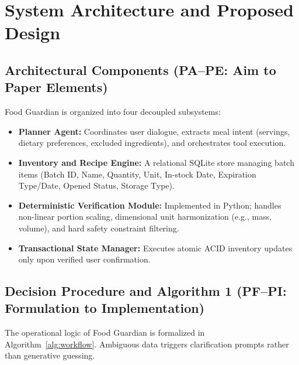 \section{System Architecture and Proposed Design}

\subsection{Architectural Components (PA--PE: Aim to Paper Elements)}
Food Guardian is organized into four decoupled subsystems:
\begin{itemize}
    \item \textbf{Planner Agent:} Coordinates user dialogue, extracts meal intent (servings, dietary preferences, excluded ingredients), and orchestrates tool execution.
    \item \textbf{Inventory and Recipe Engine:} A relational SQLite store managing batch items (Batch ID, Name, Quantity, Unit, In-stock Date, Expiration Type/Date, Opened Status, Storage Type).
    \item \textbf{Deterministic Verification Module:} Implemented in Python; handles non-linear portion scaling, dimensional unit harmonization (e.g., mass, volume), and hard safety constraint filtering.
    \item \textbf{Transactional State Manager:} Executes atomic ACID inventory updates only upon verified user confirmation.
\end{itemize}

\subsection{Decision Procedure and Algorithm 1 (PF--PI: Formulation to Implementation)}
The operational logic of Food Guardian is formalized in Algorithm~\ref{alg:workflow}. Ambiguous data triggers clarification prompts rather than generative guessing.

